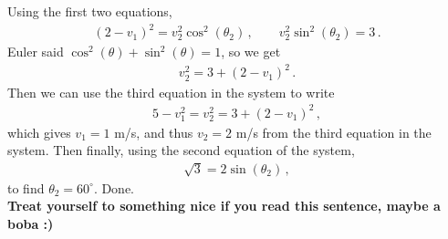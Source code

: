 \documentclass[11pt]{article}
\begin{document}
Using the first two equations,  
\begin{align*}
(2-v_1)^2 = v_2^2 \cos^2(\theta_2)\,,\qquad
v_2^2\sin^2(\theta_2) = 3 \,.
\end{align*}
Euler said $\cos^2(\theta) + \sin^2(\theta ) = 1$, so we get
\begin{align*}
v_2^2 = 3 + (2-v_1)^2\,.
\end{align*}
Then we can use the third equation in the system to write
\begin{align*}
5-v_1^2 =v_2^2 =3+(2-v_1)^2\,,
\end{align*}
which gives $v_1 = 1$ m/s, and thus $v_2 =2$ m/s from the third equation in the system. Then finally, using the second equation of the system, 
\begin{align*}
\sqrt{3} = 2\sin(\theta_2)\,,
\end{align*}
to find $\theta_2 = 60^\circ$. Done.\\

\noindent\textbf{Treat yourself to something nice if you read this sentence, maybe a boba :)}
\end{document}
